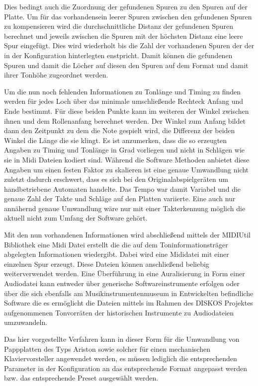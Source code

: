 Dies bedingt auch die Zuordnung der gefundenen Spuren zu den Spuren auf der Platte.
Um für das vorhandensein leerer Spuren zwischen den gefundenen Spuren zu kompensieren wird die durchschnittliche Distanz der gefundenen Spuren berechnet und jeweils zwischen die Spuren mit der höchsten Distanz eine leere Spur eingefügt.
Dies wird wiederholt bis die Zahl der vorhandenen Spuren der der in der Konfiguration hinterlegten enstpricht.
Damit können die gefundenen Spuren und damit die Löcher auf diesen den Spuren auf dem Format und damit ihrer Tonhöhe zugeordnet werden.

Um die nun noch fehlenden Informationen zu Tonlänge und Timing zu finden werden für jedes Loch über das minimale umschließende Rechteck Anfang und Ende bestimmt.
Für diese beiden Punkte kann im weiteren der Winkel zwischen ihnen und dem Rollenanfang berechnet werden. %
Der Winkel zum Anfang bildet dann den Zeitpunkt zu dem die Note gespielt wird, die Differenz der beiden Winkel die Länge die sie klingt.
Es ist anzumerken, dass die so erzeugten Angaben zu Timing und Tonlänge in Grad vorliegen und nicht in Schlägen wie sie in Midi Dateien kodiert sind.
Während die Software Methoden anbietet diese Angaben um einen festen Faktor zu skalieren ist eine genaue Umwandlung nicht zuletzt dadurch erschwert, dass es sich bei den Originalabspielgeräten um handbetriebene Automaten handelte.
Das Tempo war damit Variabel und die genaue Zahl der Takte und Schläge auf den Platten variierte.
Eine auch nur annähernd genaue Umwandlung wäre nur mit einer Takterkennung möglich die aktuell nicht zum Umfang der Software gehört.


Mit den nun vorhandenen Informationen wird abschließend mittels der MIDIUtil Bibliothek \parencite[]{midiutil} eine Midi Datei erstellt die die auf dem Toninformationsträger abgelegten Informationen wiedergibt.
Dabei wird eine Mididatei mit einer einzelnen Spur erzeugt.
Diese Dateien können anschließend beliebig weiterverwendet werden.
Eine Überführung in eine Auralisierung in Form einer Audiodatei kann entweder über generische Softwareinstrumente erfolgen oder über die sich ebenfalls am Musikinstrumentenmuseum in Entwickelten befindliche  \parencite[]{midiauralizer} Software die es ermöglicht die Dateien mittels im Rahmen des DISKOS Projektes aufgenommenen Tonvorräten der historischen Instrumente zu Audiodateien umzuwandeln.

Das hier vorgestellte Verfahren kann in dieser Form für die Umwandlung von Pappplatten des Typs Ariston sowie solcher für einen mechanischen Klaviervorsteller angewendet werden, es müssen lediglich die entsprechenden Parameter in der Konfiguration an das entsprechende Format angepasst werden bzw. das entsprechende Preset ausgewählt werden. 


